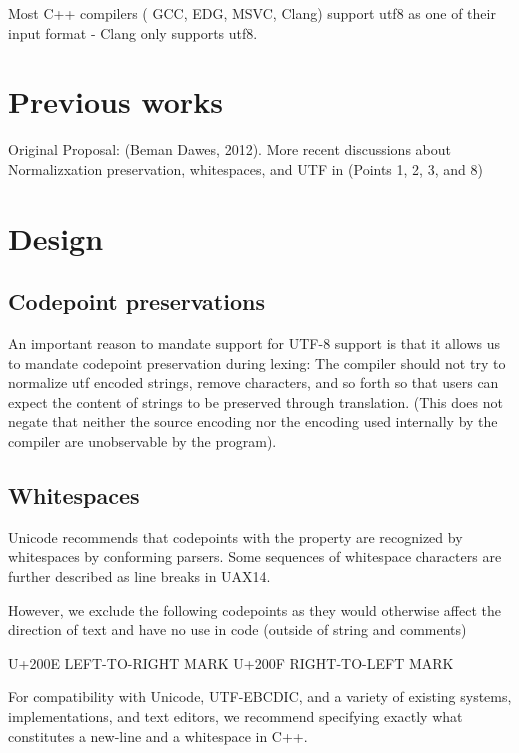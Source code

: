 \documentclass{wg21}
\begin{document}
Most C++ compilers ( GCC, EDG, MSVC, Clang) support utf8 as one of their input format - Clang only supports utf8.

\section{Previous works}

Original Proposal:  (Beman Dawes, 2012).
More recent discussions about Normalizxation preservation, whitespaces, and UTF in  (Points 1, 2, 3, and 8)

\section{Design}

\subsection{Codepoint preservations}

An important reason to mandate support for UTF-8 support is that it allows us to mandate codepoint preservation during lexing:
The compiler should not try to normalize utf encoded strings, remove characters, and so forth so that users can expect the content
of strings to be preserved through translation.
(This does not negate that neither the source encoding nor the encoding used internally by the compiler are unobservable by the program).

\subsection{Whitespaces}

Unicode recommends that codepoints with the  property are recognized by
whitespaces by conforming parsers.
Some sequences of whitespace characters are further described as line breaks in UAX14.

However, we exclude the following codepoints as they would otherwise affect the direction of text and have no use in code (outside of string and comments)

\begin{codeblock}
    U+200E LEFT-TO-RIGHT MARK
    U+200F RIGHT-TO-LEFT MARK
\end{codeblock}

For compatibility with Unicode, UTF-EBCDIC, and a variety of existing systems, implementations, and text editors,
we recommend specifying exactly what constitutes a new-line and a whitespace in C++.
\end{document}

